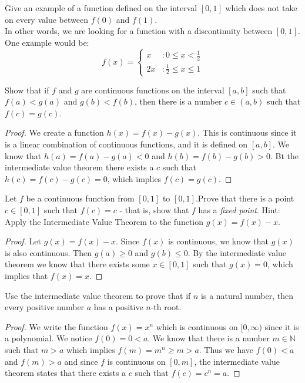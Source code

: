 \documentclass[12pt]{book}
\newcommand{\N}{\mathbb{N}}
\newenvironment{exercise}[2][Exercise]{\begin{trivlist}
\item[\hskip \labelsep {\bfseries #1}\hskip \labelsep {\bfseries #2.}]}{\end{trivlist}}
\begin{document}
\begin{exercise}{3.2.7}
Give an example of a function defined on the interval $[0,1]$ which does not take on every value between $f(0)$ and $f(1)$. \\

In other words, we are looking for a function with a discontinuity between $[0,1]$. One example would be:
 \begin{displaymath}
   f(x) = \left\{
     \begin{array}{lr}
       x & : 0 \leq x < \frac{1}{2} \\
       2x & : \frac{1}{2} \leq x \leq 1
     \end{array}
   \right.
\end{displaymath} 

\end{exercise}


\begin{exercise}{3.2.8}
    Show that if $f$ and $g$ are continuous functions on the interval $[a,b]$ such that $f(a)< g(a)$ and $g(b)<f(b)$, then there is a number $c \in (a,b)$ such that $f(c)=g(c)$. 
    
    \begin{proof}
    We create a function $h(x)=f(x)-g(x)$. This is continuous since it is a linear combination of continuous functions, and it is defined on $[a,b]$. We know that $h(a)=f(a)-g(a)<0$ and $h(b)=f(b)-g(b)>0$.  Bt the intermediate value theorem there exists a $c$ such that $h(c)=f(c)-g(c)=0$, which implies $f(c)=g(c)$.
    \end{proof}
\end{exercise}



\begin{exercise}{3.2.9}
Let $f$ be a continuous function from $[0,1]$ to $[0,1]$.Prove that there is a point $c \in [0,1]$ such that $f(c) = c$ - that is, show that $f$ has a \emph{fixed point}. Hint: Apply the Intermediate Value Theorem to the function $g(x) = f(x)-x$. 
	\begin{proof}
	Let $g(x) = f(x) -x$. Since $f(x)$ is continuous, we know that $g(x)$ is also continuous. Then $g(a) \geq 0$ and $g(b) \leq 0$. By the intermediate value theorem we know that there exists some $x \in [0,1]$ such that $g(x) = 0$, which implies that $f(x)=x$.
	\end{proof}
\end{exercise}


\begin{exercise}{3.2.10}
    Use the intermediate value theorem to prove that if $n$ is a natural number, then every positive number $a$ has a positive $n$-th root.
    
    \begin{proof}
    We write the function $f(x)=x^n$ which is continuous on $[0,\infty)$ since it is a polynomial. We notice $f(0)=0<a$. We know that there is a number $m\in \N$ such that $m>a$ which implies $f(m)=m^n \geq m > a$. Thus we have $f(0) < a$ and $f(m)>a$ and since $f$ is continuous on $[0,m]$, the intermediate value theorem states that there exists a $c$ such that $f(c)=c^n=a$.
    \end{proof}
\end{exercise}
\end{document}
